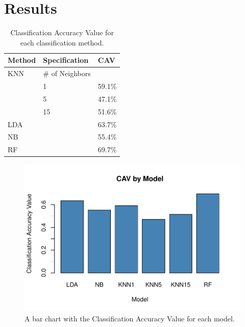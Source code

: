\documentclass[12pt]{article}
\begin{document}
\section{Results}
\label{sec:resu}

\begin{table}[]
    \centering
    \begin{tabular}{@{}lll@{}}
    \toprule
\textbf{Method} & \textbf{Specification} &\textbf{CAV} \\
\midrule
    KNN                          & \# of Neighbors  &          \\
                                 & 1  & 59.1\%   \\
                                 & 5  & 47.1\%   \\
                                 & 15 & 51.6\%   \\ \midrule
    LDA      &    & 63.7\%   \\ \midrule
    NB       &    & 55.4\%   \\ \midrule
    RF &    & 69.7\%   \\ \bottomrule
    \end{tabular}
    \caption{Classification Accuracy Value for each classification method.}
    \label{tab:results_table}
    \end{table}

\begin{figure}[tbp]
 \centering
 \includegraphics[width=\textwidth]{model_performance_figure.pdf}
 \caption{A bar chart with the Classification Accuracy Value for each model.}
 \label{fig:performance}
\end{figure}
\end{document}
